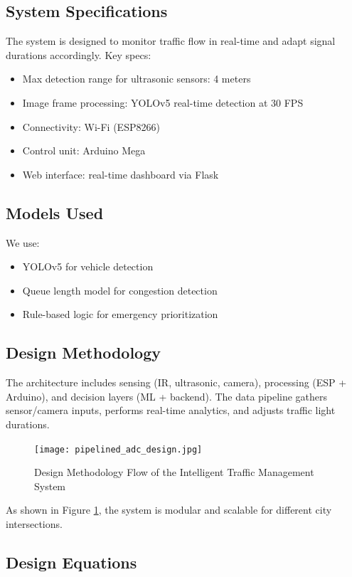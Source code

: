 \documentclass[12pt]{report}
\begin{document}
\subsection{System Specifications}
The system is designed to monitor traffic flow in real-time and adapt signal durations accordingly. Key specs:
\begin{itemize}
\item Max detection range for ultrasonic sensors: 4 meters
\item Image frame processing: YOLOv5 real-time detection at 30 FPS
\item Connectivity: Wi-Fi (ESP8266)
\item Control unit: Arduino Mega
\item Web interface: real-time dashboard via Flask
\end{itemize}

\subsection{Models Used}
We use:
\begin{itemize}
\item YOLOv5 for vehicle detection
\item Queue length model for congestion detection
\item Rule-based logic for emergency prioritization
\end{itemize}

\subsection{Design Methodology}
The architecture includes sensing (IR, ultrasonic, camera), processing (ESP + Arduino), and decision layers (ML + backend). The data pipeline gathers sensor/camera inputs, performs real-time analytics, and adjusts traffic light durations.

\begin{figure}[htb]
\centering
\texttt{[image: pipelined\_adc\_design.jpg]}
\caption{Design Methodology Flow of the Intelligent Traffic Management System}
\label{fig:design_flow}
\end{figure}

As shown in Figure \ref{fig:design_flow}, the system is modular and scalable for different city intersections.

\subsection{Design Equations}
\end{document}

